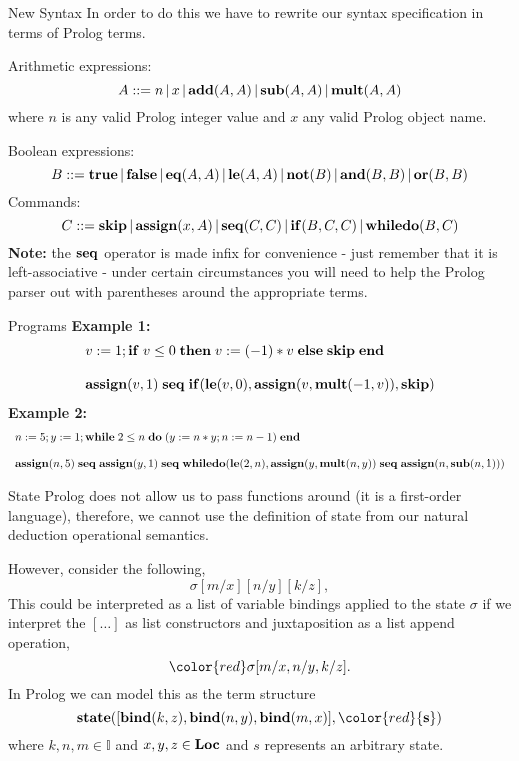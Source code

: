 \documentclass{beamer}
\begin{document}
\begin{frame}{New Syntax}
\scriptsize
In order to do this we have to rewrite our syntax specification in terms of Prolog terms.

\vspace{.1in}

Arithmetic expressions:
\[
A ::= n \,|\, x \,|\, {\bf add}(A, A) \,|\, {\bf sub}(A, A) \,|\, {\bf mult}(A, A)
\]
where $n$ is any valid Prolog integer value and $x$ any valid Prolog object name.

\noindent
Boolean expressions:
\[
B ::= \mbox{\bf true} \,|\, \mbox{\bf false} \,|\, {\bf eq}(A,A) \,|\,
	{\bf le}(A, A) \,|\, {\bf not}(B) \,|\, {\bf and}(B, B) \,|\, {\bf or}(B, B)
\]
Commands:
\[
C ::={\bf skip} \,|\, {\bf assign}(x,A) \,|\, {\bf seq}(C,C) \,|\,
	{\bf if}(B, C,  C) \,|\,
	{\bf whiledo}(B, C)
\]
{\bf Note:} the $\bf seq$ operator is made infix for convenience - just remember that it is left-associative - under certain
circumstances you will need to help the Prolog parser out with parentheses around the appropriate terms.
\end{frame}

\begin{frame}{Programs}
\tiny
{\bf Example 1:}
\[
\begin{array}{l}
v := 1; {\bf if}\; {v \le 0}\;{\bf then}\;{v := (-1)*v}\;{\bf else}\;{{\bf skip}}\;\mbox{\bf end}\\
\\
{\bf assign}(v, 1)\; {\bf seq}\; {\bf if}({\bf le}(v , 0), {\bf assign}(v, {\bf mult}(-1,v)),{\bf skip})
\end{array}
\]
{\bf Example 2:}
\[
\begin{array}{l}
n := 5 ; y := 1 ; {\bf while}\; {2 \le n}\;{\bf do}\;{(y := n*y ; n := n - 1)}\; \mbox{\bf end}\\
\\
{\bf assign}(n,5) \; {\bf seq}\; {\bf assign}(y,1) \; {\bf seq}\; {\bf whiledo}({\bf le}(2,n),{\bf assign}(y,{\bf mult}(n,y)) \; {\bf seq}\; {\bf assign}(n,{\bf sub}(n,1)))
\end{array}
\]


\end{frame}

\begin{frame}{State}
\small
Prolog does not allow us to pass functions around (it is a first-order language), therefore, we cannot
use the definition of state from our natural deduction operational semantics.

\vspace{.1in}

However, consider the following,
\[
\sigma[m/x][n/y][k/z],
\]
This could be interpreted as a list of variable bindings applied to the state $\sigma$ if
we interpret the $[\ldots ]$ as list constructors and juxtaposition as a list append operation,
\[
{\color{red}\sigma}[m/x,n/y,k/z].
\]
In Prolog we can model this as the term structure
\[
{\bf state}([{\bf bind}(k,z),{\bf bind}(n,y),{\bf bind}(m,x)],{\color{red}{\bf s}})
\]
where $k,n,m\in \mathbb{I}$ and $x,y,z\in\mbox{\bf Loc}$ and $s$ represents an arbitrary state.
\end{frame}
\end{document}
